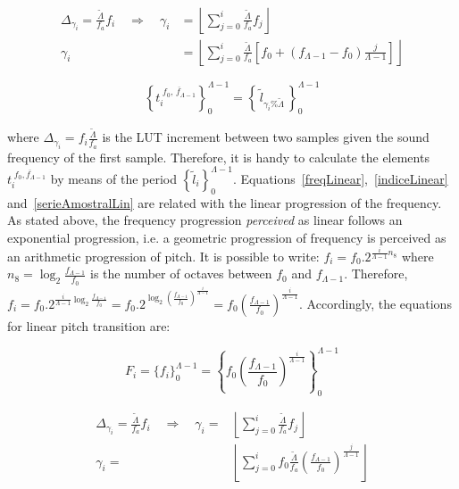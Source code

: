 \begin{equation}\label{indiceLinear}
\begin{split}
	\Delta_{\gamma_i}=\frac{\widetilde{\Lambda}}{f_a}f_i \quad \Rightarrow \quad \gamma_i & = \left \lfloor \sum_{j=0}^{i} \frac{\widetilde{\Lambda}}{f_a}f_j \right \rfloor \\
	\gamma_i & =  \left \lfloor \sum_{j=0}^{i} \frac{\widetilde{\Lambda}}{f_a} \left [f_0 + (f_{\Lambda-1}-f_0)\frac{j}{\Lambda-1} \right ] \right \rfloor 
\end{split}
\end{equation}

\begin{equation}\label{serieAmostralLin}
 \left\{t_i^{\;\overline{f_0,\, f_{\Lambda-1}}}\right\}_0^{\Lambda-1}=\left\{\,\widetilde{l}_{\gamma_i \% \widetilde{\Lambda}}\,\right\}_0^{\Lambda-1}
\end{equation}

\noindent where $\Delta_{\gamma_i}=f_i\frac{\widetilde{\Lambda}}{f_a}$ is the LUT increment between two samples given the sound frequency of the first sample. Therefore, it is handy to calculate the elements $t_i^{\;\overline{f_0,f_{\Lambda-1}}}$ by means of the period $\left\{\widetilde{l}_i\right\}_0^{\Lambda-1}$. Equations~\ref{freqLinear},~\ref{indiceLinear} and~\ref{serieAmostralLin} are related with the linear progression of the frequency. As stated above, the frequency progression \emph{perceived} as linear follows an exponential progression, i.e. a geometric progression of frequency is perceived as an arithmetic progression of pitch. It is possible to write: $f_i=f_0 . 2^{\frac{i}{\Lambda-1} n_8}$ where $n_8=\log_2\frac{f_{\Lambda-1}}{f_0}$ is the number of octaves between $f_0$ and $f_{\Lambda-1}$.
Therefore, $f_i=f_0 . 2^{\frac{i}{\Lambda-1}\log_2\frac{f_{\Lambda-1}}{f_0}}=
 f_0 . 2^{\log_2\left ( \frac{f_{\Lambda-1}}{f_0} \right )^{\frac{i}{\Lambda-1}}}=
 f_0 \left ( \frac{f_{\Lambda-1}}{f_0} \right ) ^{\frac{i}{\Lambda -1}}$. Accordingly, the equations for linear pitch transition are:

\begin{equation}\label{freqExponencial}
 F_i=\{f_i\}_0^{\Lambda-1}=  \left\{f_0 \left ( \frac{f_{\Lambda-1}}{f_0} \right ) ^{\frac{i}{\Lambda -1}} \right\}_0^{\Lambda-1}
\end{equation}

\begin{equation}\label{indiceExponencial}
\begin{split}
 \Delta_{\gamma_i}= \frac{\widetilde{\Lambda}}{f_a}f_i \quad \Rightarrow  \quad \gamma_i= & \left \lfloor \sum_{j=0}^{i} \frac{\widetilde{\Lambda}}{f_a}f_j \right \rfloor \\
	\gamma_i = & \left \lfloor \sum_{j=0}^{i} f_0 \frac{\widetilde{\Lambda}}{f_a} \left ( \frac{f_{\Lambda-1}}{f_0} \right ) ^{\frac{j}{\Lambda -1}} \right \rfloor
\end{split}
\end{equation}


